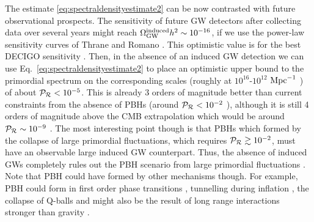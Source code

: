 \documentclass[a4paper,11pt]{article}
\numberwithin{equation}{section}
\begin{document}
The estimate \eqref{eq:spectraldensityestimate2} can be now contrasted with future observational prospects. The sensitivity of future GW detectors after collecting data over several years might reach $\Omega^{\rm induced}_{\rm GW}h^2\sim 10^{-16}$, if we use the power-law sensitivity curves of Thrane and Romano \cite{Thrane:2013oya}. This optimistic value is for the best DECIGO sensitivity \cite{Kawamura:2011zz,Yagi:2011wg}. Then, in the absence of an induced GW detection we can use Eq.~\eqref{eq:spectraldensityestimate2} to place an optimistic upper bound to the primordial spectrum on the corresponding scales (roughly at $10^{16}$-$10^{12}$ ${\rm Mpc}^{-1}$ ) of about ${\cal P}_{\cal R}<10^{-5}$. This is already 3 orders of magnitude better than current constraints from the absence of PBHs (around ${\cal P}_{\cal R}<10^{-2}$ \cite{Sasaki:2018dmp}), although it is still 4 orders of magnitude above the CMB extrapolation which would be around ${\cal P}_{\cal R}\sim10^{-9}$ \cite{Akrami:2018odb}. The most interesting point though is that PBHs which formed by the collapse of large primordial fluctuations, which requires ${\cal P}_{\cal R}\gtrsim 10^{-2}$, must have an observable large induced GW counterpart. Thus, the absence of induced GWs completely rules out the PBH scenario from large primordial fluctuations \cite{Hawking:1974sw,Carr:1974nx}. Note that PBH could have formed by other mechanisms though. For example, PBH could form in first order phase transitions \cite{Crawford:1982yz,Kodama:1982sf}, tunnelling during inflation \cite{Garriga:2015fdk}, the collapse of Q-balls \cite{Cotner:2016cvr,Cotner:2019ykd} and might also be the result of long range interactions stronger than gravity \cite{Amendola:2017xhl,Savastano:2019zpr,Flores:2020drq}.
\end{document}

